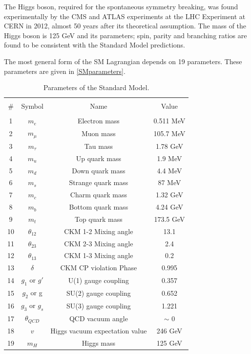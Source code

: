 The Higgs boson, required for the spontaneous symmetry breaking, was found experimentally by the CMS and ATLAS experiments at the LHC Experiment at CERN\cite{HiggsCMS,HiggsATLAS} in 2012, almost 50 years after its theoretical assumption. The mass of the Higgs boson is 125 GeV and its parameters; spin, parity and branching ratios are found to be consistent with the Standard Model predictions\cite{Higgsprecision1, Higgsprecision2}.

The most general form of the SM Lagrangian depends on 19 parameters. These parameters are given in \autoref{SMparameters}.
\begin{table}[ht]
	{\setlength{\tabcolsep}{14pt}
		\caption{Parameters of the Standard Model.}
		\begin{center}
			\vspace{-6mm}
			\begin{tabular}{cccc}
				\hline \\[-2.45ex] \hline \\[-2.1ex]
				\# & Symbol & Name & Value \\
				\hline \\[-1.8ex]
				1 & $m_e$ & Electron mass & 0.511 MeV \\
				2 & $m_\mu$ & Muon mass & 105.7 MeV \\
				3 & $m_\tau$ & Tau mass & 1.78 GeV \\
				4 & $m_u$ & Up quark mass & 1.9 MeV \\
				5 & $m_d$ & Down quark mass & 4.4 MeV \\
				6 & $m_s$ & Strange quark mass & 87 MeV \\
				7 & $m_c$ & Charm quark mass & 1.32 GeV \\
				8 & $m_b$ & Bottom quark mass & 4.24 GeV \\
				9 & $m_t$ & Top quark mass & 173.5 GeV \\
				10 & $\theta_{12}$ & CKM 1-2 Mixing angle & 13.1\textdegree \\
				11 & $\theta_{23}$ & CKM 2-3 Mixing angle & 2.4\textdegree \\
				12 & $\theta_{13}$ & CKM 1-3 Mixing angle & 0.2\textdegree \\
				13 & $\delta$ & CKM CP violation Phase & 0.995 \\
				14 & $g_1$ or $g\prime$ & U(1) gauge coupling & 0.357 \\
				15 & $g_2$ or g & SU(2) gauge coupling & 0.652 \\
				16 & $g_3$ or $g_s$ & SU(3) gauge coupling & 1.221 \\
				17 & $\theta_{QCD}$ & QCD vacuum angle & $\sim $ 0 \\
				18 & $v$ & Higgs vacuum expectation value & 246 GeV \\
				19 & $m_H$ & Higgs mass & 125 GeV \\
				\hline
			\end{tabular}
			\vspace{-6mm}
		\end{center}
		\label{SMparameters}}
\end{table}

